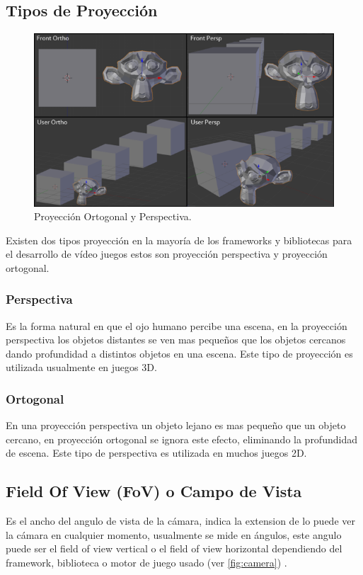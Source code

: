 \subsection{Tipos de Proyección}
\setlength\intextsep{0pt}
\begin{figure}
\includegraphics[width=\linewidth]{semana2/projections.png}
\caption{Proyección Ortogonal y Perspectiva.}
\end{figure}
Existen dos tipos proyección en la mayoría de los frameworks y bibliotecas para el desarrollo de vídeo juegos estos son proyección perspectiva y proyección ortogonal.
\subsubsection{Perspectiva}
Es la forma natural en que el ojo humano percibe una escena, en la proyección perspectiva los objetos distantes se ven mas pequeños que los objetos cercanos dando profundidad a distintos objetos en una escena. Este tipo de proyección es utilizada usualmente en juegos 3D.
\subsubsection{Ortogonal}
En una proyección perspectiva un objeto lejano es mas pequeño que un objeto cercano, en proyección ortogonal se ignora este efecto, eliminando la profundidad de escena. Este tipo de perspectiva es utilizada en muchos juegos 2D.
\subsection{Field Of View (FoV) o Campo de Vista}
Es el ancho del angulo de vista de la cámara, indica la extension de lo puede ver la cámara en cualquier momento, usualmente se mide en ángulos, este angulo puede ser el field of view vertical o el field of view horizontal dependiendo del framework, biblioteca o motor de juego usado (ver \ref{fig:camera}) \cite{feng_fovy}.
